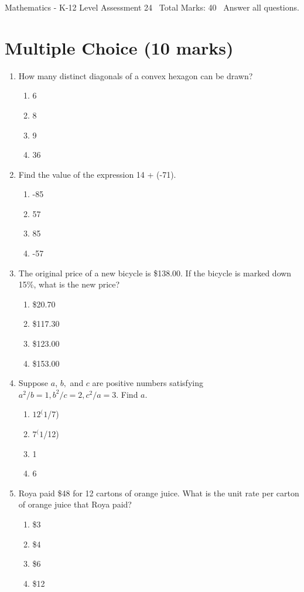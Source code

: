 \documentclass[12pt]{article}
\begin{document}
\begin{center}
Mathematics - K-12 Level Assessment 24 \
Total Marks: 40 \
Answer all questions.
\end{center}

\section*{Multiple Choice (10 marks)}
\begin{enumerate}[label=\arabic*.]
\item How many distinct diagonals of a convex hexagon can be drawn?
\begin{enumerate}[label=(\alph*)]
    \item 6
    \item 8
    \item 9
    \item 36
\end{enumerate}
\item Find the value of the expression 14 + (-71).
\begin{enumerate}[label=(\alph*)]
    \item -85
    \item 57
    \item 85
    \item -57
\end{enumerate}
\item The original price of a new bicycle is \$138.00. If the bicycle is marked down 15\%, what is the new price?
\begin{enumerate}[label=(\alph*)]
    \item \$20.70
    \item \$117.30
    \item \$123.00
    \item \$153.00
\end{enumerate}
\item Suppose $a$, $b,$ and $c$ are positive numbers satisfying $a^2/b = 1, b^2/c = 2, c^2/a = 3$. Find $a$.
\begin{enumerate}[label=(\alph*)]
    \item $12^(1$/7)
    \item $7^(1$/12)
    \item 1
    \item 6
\end{enumerate}
\item Roya paid \$48 for 12 cartons of orange juice. What is the unit rate per carton of orange juice that Roya paid?
\begin{enumerate}[label=(\alph*)]
    \item \$3
    \item \$4
    \item \$6
    \item \$12
\end{enumerate}
\end{enumerate}
\end{document}
